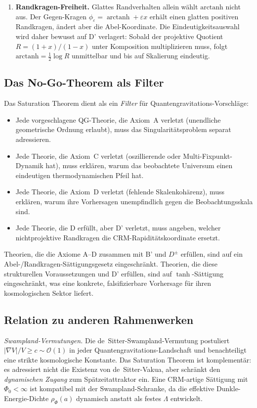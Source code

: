 \documentclass[aps,prd,twocolumn,superscriptaddress,nofootinbib]{revtex4-2}
\begin{document}
\begin{enumerate}
\item \textbf{Randkragen-Freiheit.} Glattes Randverhalten allein wählt $\mathrm{arctanh}$ nicht aus. Der Gegen-Kragen $\phi_\varepsilon=\operatorname{arctanh}+\varepsilon x$ erhält einen glatten positiven Randkragen, ändert aber die Abel-Koordinate. Die Eindeutigkeitsauswahl wird daher bewusst auf D' verlagert: Sobald der projektive Quotient $R=(1+x)/(1-x)$ unter Komposition multiplizieren muss, folgt $\mathrm{arctanh}=\frac12\log R$ unmittelbar und bis auf Skalierung eindeutig.
\end{enumerate}

\subsection{Das No-Go-Theorem als Filter}

Das Saturation Theorem dient als ein \textit{Filter} für Quantengravitations-Vorschläge:

\begin{itemize}
\item Jede vorgeschlagene QG-Theorie, die Axiom~A verletzt (unendliche geometrische Ordnung erlaubt), muss das Singularitätsproblem separat adressieren.
\item Jede Theorie, die Axiom~C verletzt (oszillierende oder Multi-Fixpunkt-Dynamik hat), muss erklären, warum das beobachtete Universum einen eindeutigen thermodynamischen Pfeil hat.
\item Jede Theorie, die Axiom~D verletzt (fehlende Skalenkohärenz), muss erklären, warum ihre Vorhersagen unempfindlich gegen die Beobachtungsskala sind.
\item Jede Theorie, die D erfüllt, aber D' verletzt, muss angeben, welcher nichtprojektive Randkragen die CRM-Rapiditätskoordinate ersetzt.
\end{itemize}

Theorien, die die Axiome A--D zusammen mit B' und $D^\pm$ erfüllen, sind auf ein Abel-/Randkragen-Sättigungsgesetz eingeschränkt. Theorien, die diese strukturellen Voraussetzungen und D' erfüllen, sind auf $\tanh$-Sättigung eingeschränkt, was eine konkrete, falsifizierbare Vorhersage für ihren kosmologischen Sektor liefert.

\subsection{Relation zu anderen Rahmenwerken}

\textit{Swampland-Vermutungen.} Die de~Sitter-Swampland-Vermutung \cite{Obied2018} postuliert $|\nabla V|/V \geq c \sim \mathcal{O}(1)$ in jeder Quantengravitations-Landschaft und benachteiligt eine strikte kosmologische Konstante. Das Saturation Theorem ist komplementär: es adressiert nicht die Existenz von de~Sitter-Vakua, aber schränkt den \textit{dynamischen Zugang} zum Spätzeitattraktor ein. Eine CRM-artige Sättigung mit $\Phi_0 < \infty$ ist kompatibel mit der Swampland-Schranke, da die effektive Dunkle-Energie-Dichte $\rho_\Phi(a)$ dynamisch anstatt als festes $\Lambda$ entwickelt.
\end{document}
